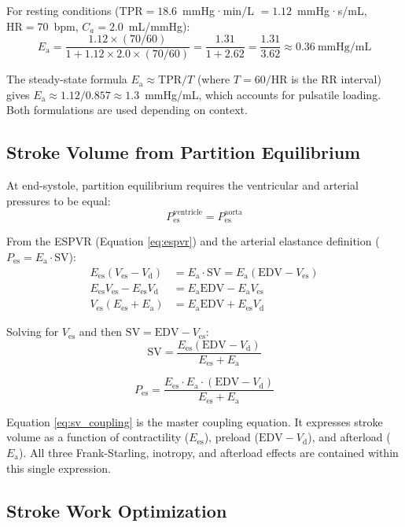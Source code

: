\documentclass[10pt,twocolumn,a4paper]{article}
\theoremstyle{remark}
\newcommand{\Ees}{E_{\mathrm{es}}}
\newcommand{\Ea}{E_{\mathrm{a}}}
\newcommand{\Vd}{V_{\mathrm{d}}}
\newcommand{\Ves}{V_{\mathrm{es}}}
\newcommand{\Pes}{P_{\mathrm{es}}}
\newcommand{\SV}{\mathrm{SV}}
\newcommand{\HR}{\mathrm{HR}}
\newcommand{\TPR}{\mathrm{TPR}}
\newcommand{\EDV}{\mathrm{EDV}}
\begin{document}
For resting conditions ($\TPR = 18.6$~mmHg·min/L $= 1.12$~mmHg·s/mL, $\HR = 70$~bpm, $C_a = 2.0$~mL/mmHg):
\begin{equation}
    \Ea = \frac{1.12 \times (70/60)}{1 + 1.12 \times 2.0 \times (70/60)} = \frac{1.31}{1 + 2.62} = \frac{1.31}{3.62} \approx 0.36~\text{mmHg/mL}
\end{equation}

The steady-state formula $\Ea \approx \TPR/T$ (where $T = 60/\HR$ is the RR interval) gives $\Ea \approx 1.12/0.857 \approx 1.3$~mmHg/mL, which accounts for pulsatile loading. Both formulations are used depending on context.

\subsection{Stroke Volume from Partition Equilibrium}

At end-systole, partition equilibrium requires the ventricular and arterial pressures to be equal:
\begin{equation}
    \Pes^{\mathrm{ventricle}} = \Pes^{\mathrm{aorta}}
\end{equation}

From the ESPVR (Equation \ref{eq:espvr}) and the arterial elastance definition ($\Pes = \Ea \cdot \SV$):
\begin{align}
    \Ees(\Ves - \Vd) &= \Ea \cdot \SV = \Ea(\EDV - \Ves) \\
    \Ees \Ves - \Ees \Vd &= \Ea \EDV - \Ea \Ves \\
    \Ves(\Ees + \Ea) &= \Ea \EDV + \Ees \Vd
\end{align}

Solving for $\Ves$ and then $\SV = \EDV - \Ves$:
\begin{equation}
    \boxed{\SV = \frac{\Ees(\EDV - \Vd)}{\Ees + \Ea}}
    \label{eq:sv_coupling}
\end{equation}

\begin{equation}
    \boxed{\Pes = \frac{\Ees \cdot \Ea \cdot (\EDV - \Vd)}{\Ees + \Ea}}
    \label{eq:pes_coupling}
\end{equation}

Equation \ref{eq:sv_coupling} is the master coupling equation. It expresses stroke volume as a function of contractility ($\Ees$), preload ($\EDV - \Vd$), and afterload ($\Ea$). All three Frank-Starling, inotropy, and afterload effects are contained within this single expression.

\subsection{Stroke Work Optimization}
\end{document}
